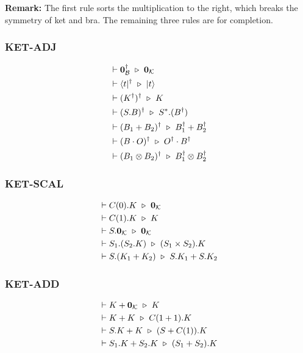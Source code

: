 \textbf{Remark: } The first rule sorts the multiplication to the right, which breaks the symmetry of ket and bra. The remaining three rules are for completion.

\subsubsection*{\textsf{KET-ADJ}}
\begin{align*}
  & \vdash \textbf{0}_\mathcal{B}^\dagger \ \triangleright\  \textbf{0}_\mathcal{K} \\
  & \vdash \langle t|^\dagger \ \triangleright\  |t\rangle\\
  & \vdash (K^\dagger)^\dagger \ \triangleright\  K \\
  & \vdash (S.B)^\dagger \ \triangleright\  S^*.(B^\dagger) \\
  & \vdash (B_1 + B_2)^\dagger \ \triangleright\  B_1^\dagger + B_2^\dagger\\
  & \vdash (B \cdot O)^\dagger \ \triangleright\  O^\dagger \cdot B^\dagger \\
  & \vdash (B_1 \otimes B_2)^\dagger \ \triangleright\  B_1^\dagger \otimes B_2^\dagger
\end{align*}

\subsubsection*{\textsf{KET-SCAL}}
\begin{align*}
  & \vdash C(0).K \ \triangleright\  \textbf{0}_{\mathcal{K}}\\
  & \vdash C(1).K \ \triangleright\  K \\
  & \vdash S.\textbf{0}_\mathcal{K} \ \triangleright\  \textbf{0}_\mathcal{K} \\
  & \vdash S_1.(S_2.K) \ \triangleright\  (S_1 \times S_2).K \\
  & \vdash S.(K_1 + K_2) \ \triangleright\  S.K_1 + S.K_2
\end{align*}

\subsubsection*{\textsf{KET-ADD}}
\begin{align*}
  & \vdash K + \textbf{0}_\mathcal{K} \ \triangleright\  K \\
  & \vdash K + K \ \triangleright\  C(1 + 1).K \\
  & \vdash S.K + K \ \triangleright\  (S + C(1)).K \\
  & \vdash S_1.K + S_2.K \ \triangleright\  (S_1 + S_2).K
\end{align*}

